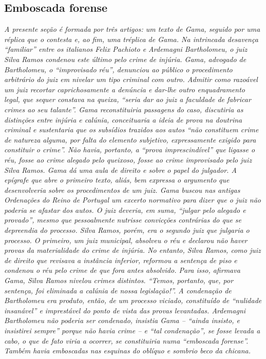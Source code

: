 {\begin{flushright}
\part{Emboscada forense}

\begin{argumento}
\emph{A presente seção é formada por três artigos: um texto de Gama,
seguido por uma réplica que o contesta e, ao fim, uma tréplica de Gama.
Na intrincada desavença ``familiar'' entre os italianos Felix Pachioto e
Ardemagni Bartholomeu, o juiz Silva Ramos condenou este último pelo
crime de injúria. Gama, advogado de Bartholomeu, o ``improvisado réu'',
denunciou ao público o procedimento arbitrário do juiz em nivelar um
tipo criminal com outro. Admitir como razoável um juiz recortar
caprichosamente a denúncia e dar-lhe outro enquadramento legal, que
sequer constava na queixa, ``seria dar ao juiz a faculdade de fabricar
crimes ao seu talante''. Gama reconstituiria passagens do caso,
discutiria as distinções entre injúria e calúnia, conceituaria a ideia
de prova na doutrina criminal e sustentaria que os subsídios trazidos
aos autos ``não constituem crime de natureza alguma, por falta do
elemento subjetivo, expressamente exigido para constituir o crime''. Não
havia, portanto, a ``prova imprescindível'' que ligasse o réu, fosse ao
crime alegado pelo queixoso, fosse ao crime improvisado pelo juiz Silva
Ramos. Gama dá uma aula de direito e sobre o papel do julgador. A
epígrafe que abre o primeiro texto, aliás, bem expressa o argumento que
desenvolveria sobre os procedimentos de um juiz. Gama buscou nas antigas
Ordenações do Reino de Portugal um excerto normativo para dizer que o
juiz não poderia se afastar dos autos. O juiz deveria, em suma, ``julgar
pelo alegado e provado'', mesmo que pessoalmente nutrisse convicções
contrárias do que se depreendia do processo. Silva Ramos, porém, era o
segundo juiz que julgaria o processo. O primeiro, um juiz municipal,
absolveu o réu e declarou não haver provas da materialidade do crime de
injúria. No entanto, Silva Ramos, como juiz de direito que revisava a
instância inferior, reformou a sentença de piso e condenou o réu pelo
crime de que fora antes absolvido. Para isso, afirmava Gama, Silva Ramos
nivelou crimes distintos. ``Temos, portanto, que, por sentença, foi
eliminada a calúnia de nossa legislação!''. A condenação de Bartholomeu
era produto, então, de um processo viciado, constituído de ``nulidade
insanável'' e imprestável do ponto de vista das provas levantadas.
Ardemagni Bartholomeu não poderia ser condenado, insistia Gama -- ``ainda
insisto, e insistirei sempre'' porque não havia crime -- e ``tal
condenação'', se fosse levada a cabo, o que de fato viria a ocorrer, se
constituiria numa ``emboscada forense''. Também havia emboscadas nas
esquinas do oblíquo e sombrio beco da chicana.}
\end{argumento}


\end{flushright}}
